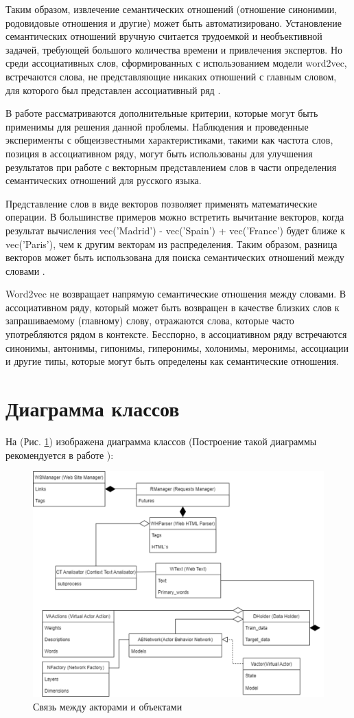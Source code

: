 Таким образом, извлечение семантических отношений (отношение синонимии, родовидовые отношения и другие) может быть автоматизировано. 
Установление семантических отношений вручную считается трудоемкой и необъективной задачей, требующей большого количества времени и 
привлечения экспертов. Но среди ассоциативных слов, сформированных с использованием модели word2vec, встречаются слова, не 
представляющие никаких отношений с главным словом, для которого был представлен ассоциативный ряд \cite{seman03}.

В работе рассматриваются дополнительные критерии, которые могут быть применимы для решения данной проблемы. Наблюдения и проведенные 
эксперименты с общеизвестными характеристиками, такими как частота слов, позиция в ассоциативном ряду, могут быть использованы для 
улучшения результатов при работе с векторным представлением слов в части определения семантических отношений для русского языка. 

Представление слов в виде векторов позволяет применять математические операции. В большинстве примеров можно встретить вычитание векторов, 
когда результат вычисления vec('Madrid') - vec('Spain') + vec('France') будет ближе к vec('Paris'), чем к другим векторам из распределения. 
Таким образом, разница векторов может быть использована для поиска семантических отношений между словами \cite{seman02}.

Word2vec не возвращает напрямую семантические отношения между словами. В ассоциативном ряду, который может быть возвращен 
в качестве близких слов к запрашиваемому (главному) слову, отражаются слова, которые часто употребляются рядом в контексте. 
Бесспорно, в ассоциативном ряду встречаются синонимы, антонимы, гипонимы, гиперонимы, холонимы, меронимы, ассоциации и другие 
типы, которые могут быть определены как семантические отношения.

\section{Диаграмма классов}

На (Рис. \ref{pic:ris12}) изображена диаграмма классов (Построение такой диаграммы рекомендуется в работе \cite{OOP}):

\begin{figure}[h]
\includegraphics[width=0.75\columnwidth]{./img/ris12.png}
\centering
\caption{Связь между акторами и объектами}
\label{pic:ris12}
\end{figure}

